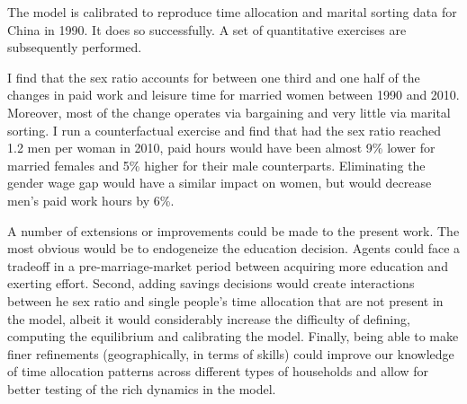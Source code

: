 \documentclass[12pt]{article}
\begin{document}
The model is calibrated to reproduce time allocation and marital sorting data for China in 1990. It does so successfully. A set of quantitative exercises are subsequently performed.

I find that the sex ratio accounts for between one third and one half of the changes in paid work and leisure time for married women between 1990 and 2010. Moreover, most of the change operates via bargaining and very little via marital sorting. I run a counterfactual exercise and find that had the sex ratio reached 1.2 men per woman in 2010, paid hours would have been almost 9\% lower for married females and 5\% higher for their male counterparts. Eliminating the gender wage gap would have a similar impact on women, but would decrease men's paid work hours by 6\%.

A number of extensions or improvements could be made to the present work. The most obvious would be to endogeneize the education decision. Agents could face a tradeoff in a pre-marriage-market period between acquiring more education and exerting effort. Second, adding savings decisions would create interactions between he sex ratio and single people's time allocation that are not present in the model, albeit it would considerably increase the difficulty of defining, computing the equilibrium and calibrating the model. Finally, being able to make finer refinements (geographically, in terms of skills) could improve our knowledge of time allocation patterns across different types of households and allow for better testing of the rich dynamics in the model.  

%
\end{document}
